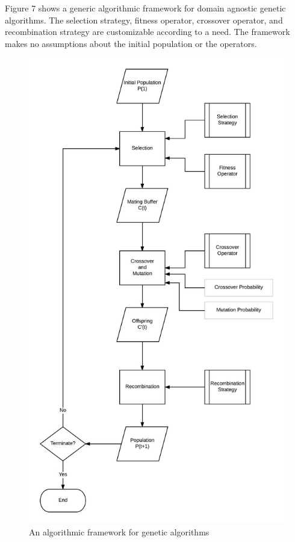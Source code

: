 \documentclass[12pt,a4paper]{article}
\begin{document}
	Figure 7 shows a generic algorithmic framework for domain agnostic genetic algorithms. The selection strategy, fitness operator, crossover operator, and recombination strategy are customizable according to a need. The framework makes no assumptions about the initial population or the operators.
	
	\begin{figure}[H]
		\includegraphics[width=\textwidth,height=\textheight]{"GA-block1"}
		\caption{An algorithmic framework for genetic algorithms}
		\centering
	\end{figure}
	
\end{document}
